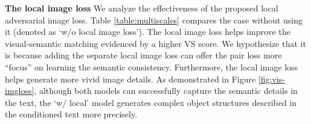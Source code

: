 \documentclass[10pt,twocolumn,letterpaper]{article}
\begin{document}

\textbf{The local image loss} We analyze the effectiveness of the proposed local adversarial image loss. 
Table \ref{table:multiscales} compares the case without using it (denoted as `w/o local image loss').
The local image loss helps improve the visual-semantic matching evidenced by a higher VS score. We hypothesize that it is because adding the separate local image loss can offer the pair loss more ``focus'' on learning the semantic consistency. 
Furthermore, the local image loss helps generate more vivid image details. As demonstrated in Figure \ref{fig:vis-imgloss}, although both models can successfully capture the semantic details in the text, the `w/ local' model generates complex object structures described in the conditioned text more precisely. 




%            
\end{document}
